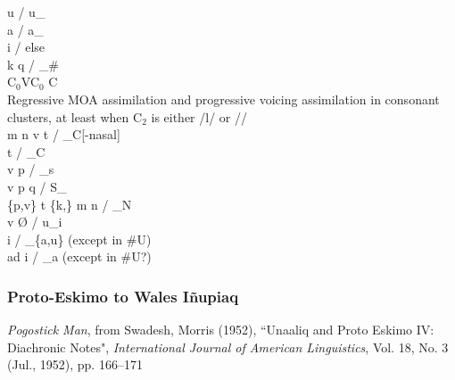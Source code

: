 \documentclass[11pt]{article}
\begin{document}
 \textrightarrow\hspace{0pt} u / u_ \\
 \textrightarrow\hspace{0pt} a / a_ \\
 \textrightarrow\hspace{0pt} i / else \\
 \textrightarrow\hspace{0pt} k q / _\# \\
C$_0$VC$_0$ \textrightarrow\hspace{0pt} C\textipa{:} \\
Regressive MOA assimilation and progressive voicing assimilation in consonant clusters, at least when C$_2$ is either /l/ or // \\
m n  \textrightarrow\hspace{0pt} v t  / _C[-nasal] \\
 \textrightarrow\hspace{0pt} t / _C \\
v \textrightarrow\hspace{0pt} p / _s \\
v  \textrightarrow\hspace{0pt} p q / S_ \\
\{p,v\} t \{k,\} \textrightarrow\hspace{0pt} m n  / _N \\
v \textrightarrow\hspace{0pt} \O\hspace{0pt} / u_i \\
 \textrightarrow\hspace{0pt} i / _\{a,u\} (except in \#U) \\
ad \textrightarrow\hspace{0pt} i / _a (except in \#U?)
\subsubsection{Proto-Eskimo to Wales I\~{n}upiaq}{\it Pogostick Man}, from Swadesh, Morris (1952), \textquotedblleft Unaaliq and Proto Eskimo IV: Diachronic Notes", \textit{International Journal of American Linguistics}, Vol. 18, No. 3 (Jul., 1952), pp. 166--171
\end{document}

